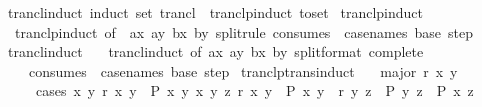 \begin{isabellebody}
{\isafoldproof}%
%
\isadelimproof
\isanewline
%
\endisadelimproof
\isanewline
{}\isamarkupfalse%
\ trancl{\isacharunderscore}{\kern0pt}induct\ {\isacharbrackleft}{\kern0pt}induct\ set{\isacharcolon}{\kern0pt}\ trancl{\isacharbrackright}{\kern0pt}\ {\isacharequal}{\kern0pt}\ tranclp{\isacharunderscore}{\kern0pt}induct\ {\isacharbrackleft}{\kern0pt}to{\isacharunderscore}{\kern0pt}set{\isacharbrackright}{\kern0pt}\isanewline
\isanewline
{}\isamarkupfalse%
\ tranclp{\isacharunderscore}{\kern0pt}induct{}\ {\isacharequal}{\kern0pt}\isanewline
\ \ tranclp{\isacharunderscore}{\kern0pt}induct\ {\isacharbrackleft}{\kern0pt}of\ {\isacharunderscore}{\kern0pt}\ {\isachardoublequoteopen}{\isacharparenleft}{\kern0pt}ax{\isacharcomma}{\kern0pt}\ ay{\isacharparenright}{\kern0pt}{\isachardoublequoteclose}\ {\isachardoublequoteopen}{\isacharparenleft}{\kern0pt}bx{\isacharcomma}{\kern0pt}\ by{\isacharparenright}{\kern0pt}{\isachardoublequoteclose}{\isacharcomma}{\kern0pt}\ split{\isacharunderscore}{\kern0pt}rule{\isacharcomma}{\kern0pt}\ consumes\ {}{\isacharcomma}{\kern0pt}\ case{\isacharunderscore}{\kern0pt}names\ base\ step{\isacharbrackright}{\kern0pt}\isanewline
\isanewline
{}\isamarkupfalse%
\ trancl{\isacharunderscore}{\kern0pt}induct{}\ {\isacharequal}{\kern0pt}\isanewline
\ \ trancl{\isacharunderscore}{\kern0pt}induct\ {\isacharbrackleft}{\kern0pt}of\ {\isachardoublequoteopen}{\isacharparenleft}{\kern0pt}ax{\isacharcomma}{\kern0pt}\ ay{\isacharparenright}{\kern0pt}{\isachardoublequoteclose}\ {\isachardoublequoteopen}{\isacharparenleft}{\kern0pt}bx{\isacharcomma}{\kern0pt}\ by{\isacharparenright}{\kern0pt}{\isachardoublequoteclose}{\isacharcomma}{\kern0pt}\ split{\isacharunderscore}{\kern0pt}format\ {\isacharparenleft}{\kern0pt}complete{\isacharparenright}{\kern0pt}{\isacharcomma}{\kern0pt}\isanewline
\ \ \ \ consumes\ {}{\isacharcomma}{\kern0pt}\ case{\isacharunderscore}{\kern0pt}names\ base\ step{\isacharbrackright}{\kern0pt}\isanewline
\isanewline
{}\isamarkupfalse%
\ tranclp{\isacharunderscore}{\kern0pt}trans{\isacharunderscore}{\kern0pt}induct{\isacharcolon}{\kern0pt}\isanewline
\ \ \ major{\isacharcolon}{\kern0pt}\ {\isachardoublequoteopen}r\isactrlsup {\isacharplus}{\kern0pt}\isactrlsup {\isacharplus}{\kern0pt}\ x\ y{\isachardoublequoteclose}\isanewline
\ \ \ \ \ cases{\isacharcolon}{\kern0pt}\ {\isachardoublequoteopen}{\isasymAnd}x\ y{\isachardot}{\kern0pt}\ r\ x\ y\ {\isasymLongrightarrow}\ P\ x\ y{\isachardoublequoteclose}\ {\isachardoublequoteopen}{\isasymAnd}x\ y\ z{\isachardot}{\kern0pt}\ r\isactrlsup {\isacharplus}{\kern0pt}\isactrlsup {\isacharplus}{\kern0pt}\ x\ y\ {\isasymLongrightarrow}\ P\ x\ y\ {\isasymLongrightarrow}\ r\isactrlsup {\isacharplus}{\kern0pt}\isactrlsup {\isacharplus}{\kern0pt}\ y\ z\ {\isasymLongrightarrow}\ P\ y\ z\ {\isasymLongrightarrow}\ P\ x\ z{\isachardoublequoteclose}\isanewline

\end{isabellebody}
